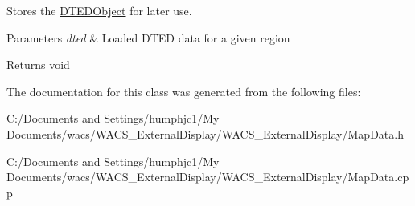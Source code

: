 Stores the \hyperlink{class_d_t_e_d_object}{DTEDObject} for later use. 


\begin{DoxyParams}{Parameters}
{\em dted} & Loaded DTED data for a given region \\
\hline
\end{DoxyParams}
\begin{DoxyReturn}{Returns}
void 
\end{DoxyReturn}


The documentation for this class was generated from the following files:\begin{DoxyCompactItemize}
\item 
C:/Documents and Settings/humphjc1/My Documents/wacs/WACS\_\-ExternalDisplay/WACS\_\-ExternalDisplay/MapData.h\item 
C:/Documents and Settings/humphjc1/My Documents/wacs/WACS\_\-ExternalDisplay/WACS\_\-ExternalDisplay/MapData.cpp\end{DoxyCompactItemize}
